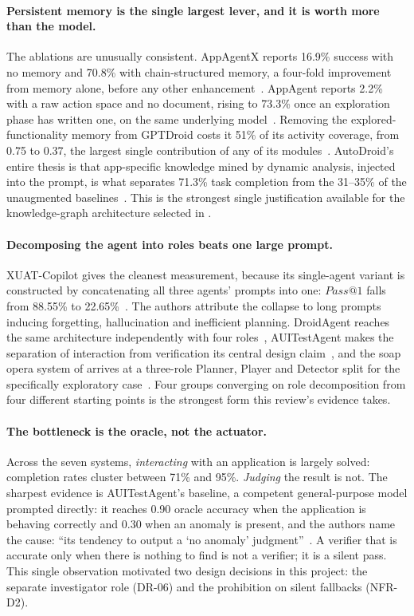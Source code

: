 \paragraph{Persistent memory is the single largest lever, and it is worth more
than the model.} The ablations are unusually consistent. AppAgentX reports
16.9\% success with no memory and 70.8\% with chain-structured memory, a
four-fold improvement from memory alone, before any other
enhancement~\cite{appagentx}. AppAgent reports 2.2\% with a raw action space
and no document, rising to 73.3\% once an exploration phase has written one, on
the same underlying model~\cite{appagent}. Removing the explored-functionality
memory from GPTDroid costs it 51\% of its activity coverage, from 0.75 to 0.37,
the largest single contribution of any of its modules~\cite{gptdroid}.
AutoDroid's entire thesis is that app-specific knowledge mined by dynamic
analysis, injected into the prompt, is what separates 71.3\% task completion
from the 31--35\% of the unaugmented baselines~\cite{autodroid}. This is the
strongest single justification available for the knowledge-graph architecture
selected in .

\paragraph{Decomposing the agent into roles beats one large prompt.} XUAT-Copilot
gives the cleanest measurement, because its single-agent variant is constructed
by concatenating all three agents' prompts into one: $Pass@1$ falls from
88.55\% to 22.65\%~\cite{xuatcopilot}. The authors attribute the collapse to
long prompts inducing forgetting, hallucination and inefficient planning.
DroidAgent reaches the same architecture independently with four
roles~\cite{droidagent}, AUITestAgent makes the separation of interaction from
verification its central design claim~\cite{auitestagent}, and the soap opera
system of  arrives at a three-role Planner, Player and
Detector split for the specifically exploratory case~\cite{soapopera}. Four
groups converging on role decomposition from four different starting points is
the strongest form this review's evidence takes.

\paragraph{The bottleneck is the oracle, not the actuator.} Across the seven
systems, \emph{interacting} with an application is largely solved: completion
rates cluster between 71\% and 95\%. \emph{Judging} the result is not. The
sharpest evidence is AUITestAgent's baseline, a competent general-purpose model
prompted directly: it reaches 0.90 oracle accuracy when the application is
behaving correctly and 0.30 when an anomaly is present, and the authors name
the cause: ``its tendency to output a `no anomaly'
judgment''~\cite{auitestagent}. A verifier that is accurate only when there is
nothing to find is not a verifier; it is a silent pass. This single observation
motivated two design decisions in this project: the separate investigator role
(DR-06) and the prohibition on silent fallbacks (NFR-D2).

